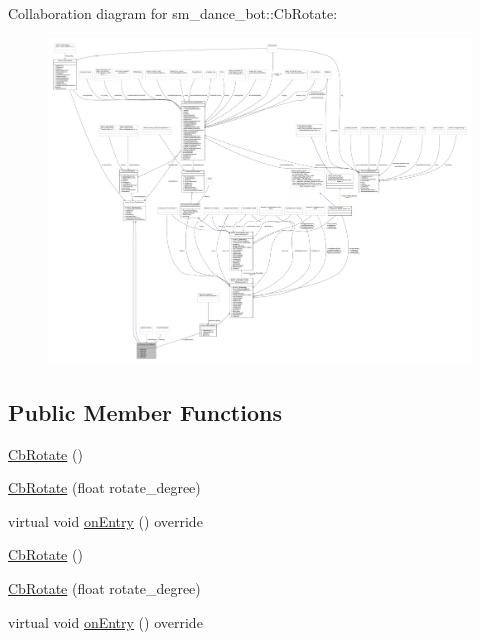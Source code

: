 Collaboration diagram for sm\+\_\+dance\+\_\+bot\+:\+:Cb\+Rotate\+:
\nopagebreak
\begin{figure}[H]
\begin{center}
\leavevmode
\includegraphics[width=350pt]{classsm__dance__bot_1_1CbRotate__coll__graph}
\end{center}
\end{figure}
\subsection*{Public Member Functions}
\begin{DoxyCompactItemize}
\item 
\hyperlink{classsm__dance__bot_1_1CbRotate_a56c0ab90797abc95aa5357fd404fa37c}{Cb\+Rotate} ()
\item 
\hyperlink{classsm__dance__bot_1_1CbRotate_ad05e2b97f956e8616b7bcfc0ebe1a160}{Cb\+Rotate} (float rotate\+\_\+degree)
\item 
virtual void \hyperlink{classsm__dance__bot_1_1CbRotate_ad4e05a82d567baea5e373b7eec187760}{on\+Entry} () override
\item 
\hyperlink{classsm__dance__bot_1_1CbRotate_a56c0ab90797abc95aa5357fd404fa37c}{Cb\+Rotate} ()
\item 
\hyperlink{classsm__dance__bot_1_1CbRotate_ad05e2b97f956e8616b7bcfc0ebe1a160}{Cb\+Rotate} (float rotate\+\_\+degree)
\item 
virtual void \hyperlink{classsm__dance__bot_1_1CbRotate_ad4e05a82d567baea5e373b7eec187760}{on\+Entry} () override
\end{DoxyCompactItemize}
